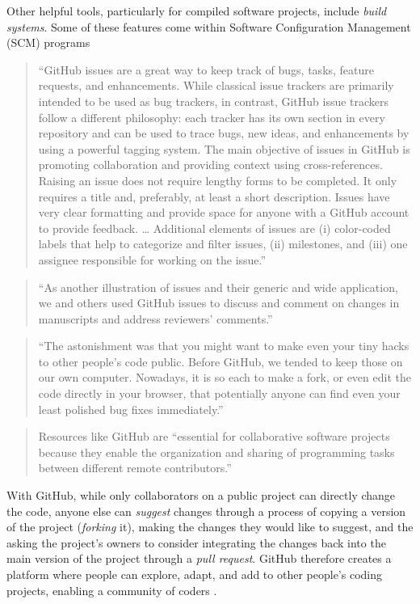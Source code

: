 \documentclass[]{tufte-book}
\begin{document}
Other helpful tools, particularly for compiled
software projects, include \emph{build systems}. Some of these features come within
Software Configuration Management (SCM) programs \citep{raymondunderstanding}

\begin{quote}
``GitHub issues are a great way to keep track of bugs, tasks, feature requests,
and enhancements. While classical issue trackers are primarily intended to be
used as bug trackers, in contrast, GitHub issue trackers follow a different
philosophy: each tracker has its own section in every repository and can be used
to trace bugs, new ideas, and enhancements by using a powerful tagging system.
The main objective of issues in GitHub is promoting collaboration and providing
context using cross-references. Raising an issue does not require lengthy forms
to be completed. It only requires a title and, preferably, at least a short description.
Issues have very clear formatting and provide space for anyone with a GitHub account
to provide feedback. \ldots{} Additional elements of issues are (i) color-coded labels
that help to categorize and filter issues, (ii) milestones, and (iii) one assignee
responsible for working on the issue.'' \citep{perez2016ten}
\end{quote}

\begin{quote}
``As another illustration of issues and their generic and wide application, we
and others used GitHub issues to discuss and comment on changes in manuscripts
and address reviewers' comments.'' \citep{perez2016ten}
\end{quote}

\begin{quote}
``The astonishment was that you might want to make even your tiny hacks to
other people's code public. Before GitHub, we tended to keep those on our own
computer. Nowadays, it is so each to make a fork, or even edit the code directly
in your browser, that potentially anyone can find even your least polished
bug fixes immediately.'' \citep{irving2011astonishments}
\end{quote}

\begin{quote}
Resources like GitHub are ``essential for collaborative software projects
because they enable the organization and sharing of programming tasks between
different remote contributors.'' \citep{perez2016ten}
\end{quote}

With GitHub, while only
collaborators on a public project can directly change the code, anyone else can
\emph{suggest} changes through a process of copying a version of the project
(\emph{forking} it), making the changes they would like to suggest, and the asking
the project's owners to consider integrating the changes back into the main
version of the project through a \emph{pull request}. GitHub therefore creates a
platform where people can explore, adapt, and add to other people's coding
projects, enabling a community of coders \citep{perez2016ten}.
\end{document}
